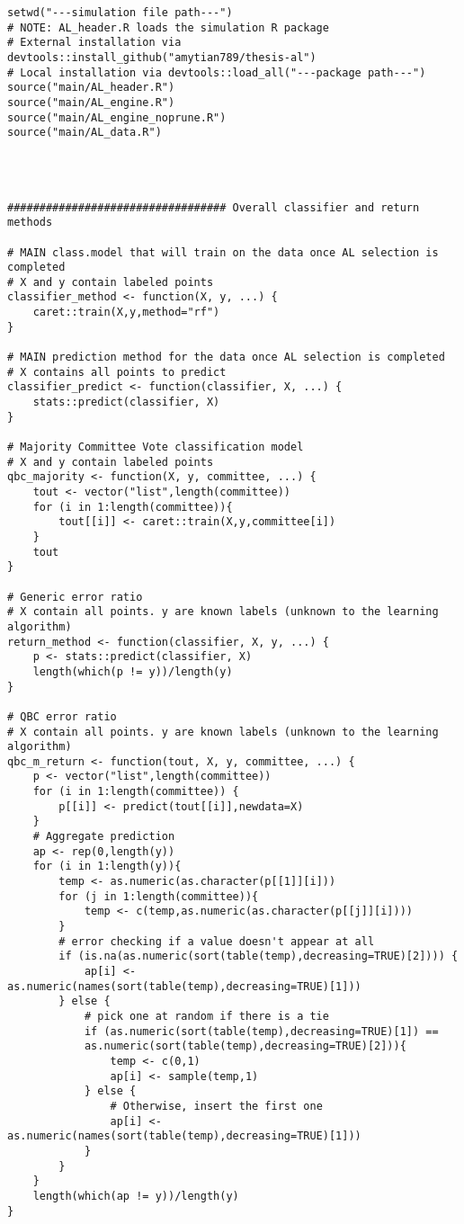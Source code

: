 {
\begin{lstlisting}
setwd("---simulation file path---")
# NOTE: AL_header.R loads the simulation R package
# External installation via devtools::install_github("amytian789/thesis-al")
# Local installation via devtools::load_all("---package path---")
source("main/AL_header.R")
source("main/AL_engine.R")
source("main/AL_engine_noprune.R")
source("main/AL_data.R")




################################## Overall classifier and return methods

# MAIN class.model that will train on the data once AL selection is completed
# X and y contain labeled points
classifier_method <- function(X, y, ...) {
	caret::train(X,y,method="rf")
}

# MAIN prediction method for the data once AL selection is completed
# X contains all points to predict
classifier_predict <- function(classifier, X, ...) {
	stats::predict(classifier, X)
}

# Majority Committee Vote classification model
# X and y contain labeled points
qbc_majority <- function(X, y, committee, ...) {
	tout <- vector("list",length(committee))
	for (i in 1:length(committee)){
		tout[[i]] <- caret::train(X,y,committee[i])
	}
	tout
}

# Generic error ratio
# X contain all points. y are known labels (unknown to the learning algorithm)
return_method <- function(classifier, X, y, ...) {
	p <- stats::predict(classifier, X)
	length(which(p != y))/length(y)
}

# QBC error ratio
# X contain all points. y are known labels (unknown to the learning algorithm)
qbc_m_return <- function(tout, X, y, committee, ...) {
	p <- vector("list",length(committee))
	for (i in 1:length(committee)) {
		p[[i]] <- predict(tout[[i]],newdata=X)
	}
	# Aggregate prediction
	ap <- rep(0,length(y))
	for (i in 1:length(y)){
		temp <- as.numeric(as.character(p[[1]][i]))
		for (j in 1:length(committee)){
			temp <- c(temp,as.numeric(as.character(p[[j]][i])))
		}
		# error checking if a value doesn't appear at all
		if (is.na(as.numeric(sort(table(temp),decreasing=TRUE)[2]))) {
			ap[i] <- as.numeric(names(sort(table(temp),decreasing=TRUE)[1]))
		} else {
			# pick one at random if there is a tie
			if (as.numeric(sort(table(temp),decreasing=TRUE)[1]) ==
			as.numeric(sort(table(temp),decreasing=TRUE)[2])){
				temp <- c(0,1)
				ap[i] <- sample(temp,1)
			} else {
				# Otherwise, insert the first one
				ap[i] <- as.numeric(names(sort(table(temp),decreasing=TRUE)[1]))
			}
		}
	}
	length(which(ap != y))/length(y)
}





\end{lstlisting}}

